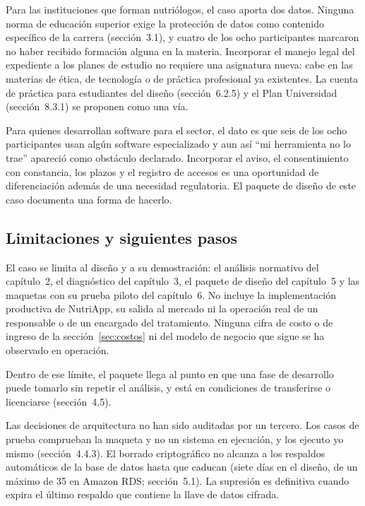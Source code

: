 \documentclass[12pt, a4paper]{article}
\begin{document}
Para las instituciones que forman nutriólogos, el caso aporta dos datos.
Ninguna norma de educación superior exige la protección de datos como
contenido específico de la carrera (sección~3.1), y cuatro de los ocho
participantes marcaron no haber recibido formación alguna en la materia.
Incorporar el manejo legal del expediente a los planes de estudio no
requiere una asignatura nueva: cabe en las materias de ética, de
tecnología o de práctica profesional ya existentes. La cuenta de
práctica para estudiantes del diseño (sección~6.2.5) y el Plan
Universidad (sección~8.3.1) se proponen como una vía.

Para quienes desarrollan software para el sector, el dato es que
seis de los ocho participantes
usan algún software especializado y aun así ``mi
herramienta no lo trae'' apareció como obstáculo declarado. Incorporar el
aviso, el consentimiento con constancia, los plazos y el registro de
accesos es una oportunidad de diferenciación además de una necesidad
regulatoria. El paquete de diseño de este caso documenta una forma de
hacerlo.

\subsection{Limitaciones y siguientes pasos}
El caso se limita al diseño y a su demostración: el análisis normativo
del capítulo~2, el diagnóstico del capítulo~3, el paquete de diseño del
capítulo~5 y las maquetas con su prueba piloto del capítulo~6. No
incluye la implementación productiva de NutriApp, su salida al mercado
ni la operación real de un responsable o de un encargado del
tratamiento. Ninguna cifra de costo o de ingreso de la
sección~\ref{sec:costos} ni del modelo de negocio que sigue se ha
observado en operación.

Dentro de ese límite, el paquete llega al punto en que una fase de desarrollo puede
tomarlo sin repetir el análisis, y está en condiciones de transferirse o
licenciarse (sección~4.5).

Las decisiones de arquitectura no han sido auditadas por un tercero. Los
casos de prueba comprueban la maqueta y no un sistema en ejecución, y
los ejecuto yo mismo (sección~4.4.3). El borrado criptográfico no
alcanza a los respaldos automáticos de la base de datos hasta que
caducan (siete días en el diseño, de un máximo de 35 en Amazon RDS;
sección~5.1). La supresión es definitiva cuando expira el último
respaldo que contiene la llave de datos cifrada.
\end{document}
